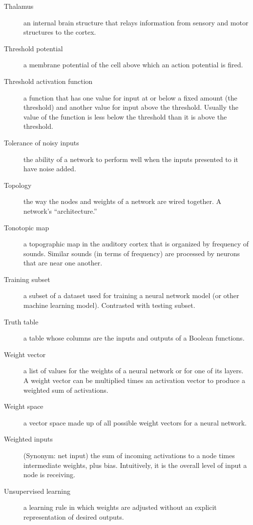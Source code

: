 \begin{description}
\item[Thalamus] an internal brain structure that relays information from sensory and motor structures to the cortex.

\item[Threshold potential] a membrane potential of the cell above which an action potential is fired. 

\item[Threshold activation function] a function that has one value for  input at or below a fixed amount (the threshold) and another value for input above the threshold. Usually the value of the function is less below the  threshold than it is above the threshold.

\item[Tolerance of noisy inputs] the ability of a network to perform well when the inputs presented to it have noise added.

\item[Topology] the way the nodes and weights of a network are wired together. A network's ``architecture.''

\item[Tonotopic map] a topographic map in the auditory cortex that is organized by frequency of sounds. Similar sounds (in terms of frequency) are processed by neurons that are near one another.

\item[Training subset] a subset of a dataset used for training a neural network model (or other machine learning model). Contrasted with testing subset.

\item[Truth table] a table whose columns are the inputs and outputs of a Boolean functions.

\item[Weight vector] a list of values for the weights of a neural network or for one of its layers. A weight vector can be multiplied times an activation vector to produce a weighted sum of activations.

\item[Weight space] a vector space made up of all possible weight vectors for a neural network.

\item[Weighted inputs] (Synonym: net input) the sum of incoming activations to a node times intermediate weights, plus bias. Intuitively, it is the overall level of input a node is receiving.

\item[Unsupervised learning] a learning rule in which weights are adjusted without an explicit representation of desired outputs.


\end{description}
